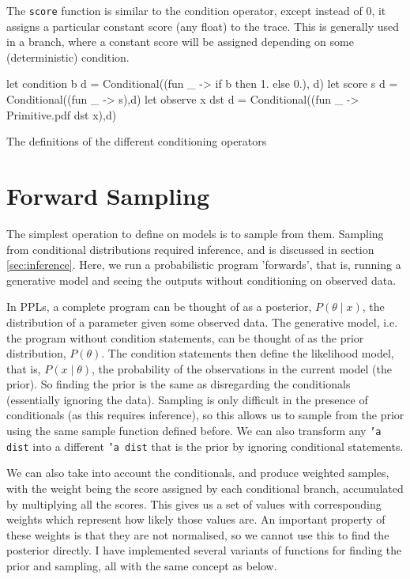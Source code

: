 The \texttt{score} function is similar to the condition operator, except instead of 0, it assigns a particular constant score (any float) to the trace. This is generally used in a branch, where a constant score will be assigned depending on some (deterministic) condition.
	
\begin{listing}[!htb]
	\centering
	\begin{ocamlcode-in}
let condition b d = Conditional((fun _ -> if b then 1. else 0.), d)
let score s d = Conditional((fun _ -> s),d)
let observe x dst d = Conditional((fun _ -> Primitive.pdf dst x),d) 
	\end{ocamlcode-in}	
	\caption{The definitions of the different conditioning operators}
	\label{lst:cond}
\end{listing}
	
\section{Forward Sampling}
The simplest operation to define on models is to sample from them. Sampling from conditional distributions required inference, and is discussed in section \ref{sec:inference}. Here, we run a probabilistic program 'forwards', that is, running a generative model and seeing the outputs without conditioning on observed data.
		
In PPLs, a complete program can be thought of as a posterior, $P(\theta\mid x)$, the distribution of a parameter given some observed data. The generative model, i.e. the program without condition statements, can be thought of as the prior distribution, $P(\theta)$. The condition statements then define the likelihood model, that is, $P(x\mid \theta)$, the probability of the observations in the current model (the prior). So finding the prior is the same as disregarding the conditionals (essentially ignoring the data). Sampling is only difficult in the presence of conditionals (as this requires inference), so this allows us to sample from the prior using the same sample function defined before. We can also transform any \texttt{'a dist} into a different \texttt{'a dist} that is the prior by ignoring conditional statements.
	
We can also take into account the conditionals, and produce weighted samples, with the weight being the score assigned by each conditional branch, accumulated by multiplying all the scores. This gives us a set of values with corresponding weights which represent how likely those values are. An important property of these weights is that they are not normalised, so we cannot use this to find the posterior directly. I have implemented several variants of functions for finding the prior and sampling, all with the same concept as below.
	
